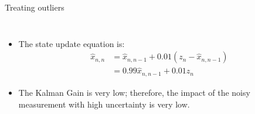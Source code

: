 \begin{frame}{Treating outliers}
\begin{columns}
\begin{itemize}
        \item The state update equation is:
        \begin{align*}
            \hat{x}_{n,n} &= \hat{x}_{n,n-1} + 0.01 (z_n - \hat{x}_{n,n-1}) \\ &= 0.99 \hat{x}_{n,n-1} + 0.01 z_n
        \end{align*}
        \item The Kalman Gain is very low; therefore, the impact of the noisy measurement with high uncertainty is very low.

    \end{itemize}
\end{columns}
\end{frame}



